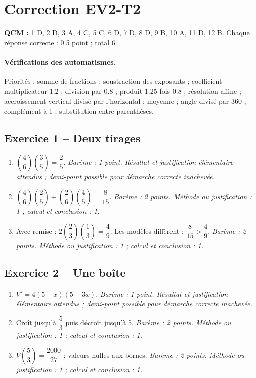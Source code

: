 \mxnewpage\section*{Correction EV2-T2}\label{EV2-T2-CORR}
\textbf{QCM :} 1 D, 2 D, 3 A, 4 C, 5 C, 6 D, 7 D, 8 D, 9 B, 10 A, 11 D, 12 B. Chaque réponse correcte : \num{0,5} point ; total 6.
\paragraph{Vérifications des automatismes.} Priorités ; somme de fractions ; soustraction des exposants ; coefficient multiplicateur \num{1,2} ; division par \num{0,8} ; produit \num{1,25} fois \num{0,8} ; résolution affine ; accroissement vertical divisé par l’horizontal ; moyenne ; angle divisé par 360 ; complément à 1 ; substitution entre parenthèses.
\subsection*{Exercice 1 -- Deux tirages}
\begin{enumerate}
\item $(\dfrac{4}{6})(\dfrac{3}{5})=\dfrac{2}{5}$. \textit{Barème : 1 point. Résultat et justification élémentaire attendus ; demi-point possible pour démarche correcte inachevée.}
\item $(\dfrac{4}{6})(\dfrac{2}{5})+(\dfrac{2}{6})(\dfrac{4}{5})=\dfrac{8}{15}$. \textit{Barème : 2 points. Méthode ou justification : 1 ; calcul et conclusion : 1.}
\item Avec remise : $2(\dfrac{2}{3})(\dfrac{1}{3})=\dfrac{4}{9}$. Les modèles diffèrent ; $\dfrac{8}{15}>\dfrac{4}{9}$. \textit{Barème : 2 points. Méthode ou justification : 1 ; calcul et conclusion : 1.}
\end{enumerate}
\subsection*{Exercice 2 -- Une boîte}
\begin{enumerate}
\item $V\prime=4(5-x)(5-3x)$. \textit{Barème : 1 point. Résultat et justification élémentaire attendus ; demi-point possible pour démarche correcte inachevée.}
\item Croît jusqu’à $\dfrac{5}{3}$ puis décroît jusqu’à 5. \textit{Barème : 2 points. Méthode ou justification : 1 ; calcul et conclusion : 1.}
\item $V(\dfrac{5}{3})=\dfrac{2000}{27}$ ; valeurs nulles aux bornes. \textit{Barème : 2 points. Méthode ou justification : 1 ; calcul et conclusion : 1.}
\end{enumerate}
